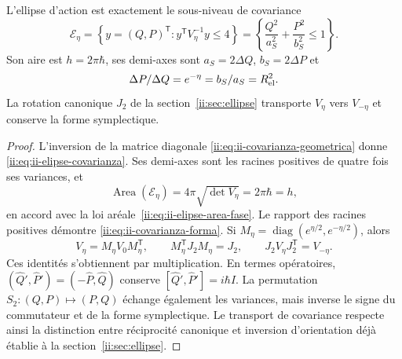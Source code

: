 \begin{proposition}
\label{ii:prop:ii-area-covarianza-reciprocidad}
L'ellipse d'action est exactement le sous-niveau de covariance
\begin{equation}
 \mathcal E_\eta
 =\left\{y=(Q,P)^{\mathsf T}:y^{\mathsf T}V_\eta^{-1}y\leq4\right\}
 =\left\{\frac{Q^2}{a_S^2}+\frac{P^2}{b_S^2}\leq1\right\}.
 \label{ii:eq:ii-elipse-covarianza}
\end{equation}
Son aire est \(h=2\pi\hbar\), ses demi-axes sont
\(a_S=2\Delta Q\), \(b_S=2\Delta P\) et
\begin{equation}
 \frac{\Delta P}{\Delta Q}=e^{-\eta}
 =\frac{b_S}{a_S}=R_{\rm el}^2.
 \label{ii:eq:ii-covarianza-forma}
\end{equation}
La rotation canonique \(J_2\) de la section~\ref{ii:sec:ellipse} transporte
\(V_\eta\) vers \(V_{-\eta}\) et conserve la forme symplectique.
\end{proposition}

\begin{proof}
L'inversion de la matrice diagonale
\eqref{ii:eq:ii-covarianza-geometrica} donne
\eqref{ii:eq:ii-elipse-covarianza}. Ses demi-axes sont les racines positives de
quatre fois ses variances, et
\[
 \operatorname{Area}(\mathcal E_\eta)
 =4\pi\sqrt{\det V_\eta}=2\pi\hbar=h,
\]
en accord avec la loi aréale~\eqref{ii:eq:ii-elipse-area-fase}.
Le rapport des racines positives démontre
\eqref{ii:eq:ii-covarianza-forma}.
Si \(M_\eta=\operatorname{diag}(e^{\eta/2},e^{-\eta/2})\), alors
\[
 V_\eta=M_\eta V_0M_\eta^{\mathsf T},\qquad
 M_\eta^{\mathsf T}J_2M_\eta=J_2,\qquad
 J_2V_\eta J_2^{\mathsf T}=V_{-\eta}.
\]
Ces identités s'obtiennent par multiplication. En termes opératoires,
\((\widehat Q',\widehat P')=(-\widehat P,\widehat Q)\) conserve
\([\widehat Q',\widehat P']=i\hbar I\). La permutation
\(S_2:(Q,P)\mapsto(P,Q)\) échange également les variances, mais inverse
le signe du commutateur et de la forme symplectique. Le transport de
covariance respecte ainsi la distinction entre réciprocité canonique et inversion
d'orientation déjà établie à la section~\ref{ii:sec:ellipse}.
\end{proof}


